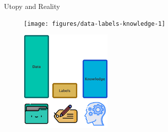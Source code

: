 \documentclass[presentation]{beamer}\mode<presentation>{\usetheme{blackAMSBolognaFC}}
\begin{document}
\begin{frame}[c,allowframebreaks]{Utopy and Reality}
    \hspace{0.5cm}
    \begin{figure}
        \texttt{[image: figures/data-labels-knowledge-1]}
    \end{figure}
    \hfill

    \framebreak

    \hfill
    \begin{figure}
        \includegraphics[width=0.4\textwidth]{figures/data-labels-knowledge-2}
    \end{figure}
    \hspace{0.5cm}

\end{frame}
\end{document}
